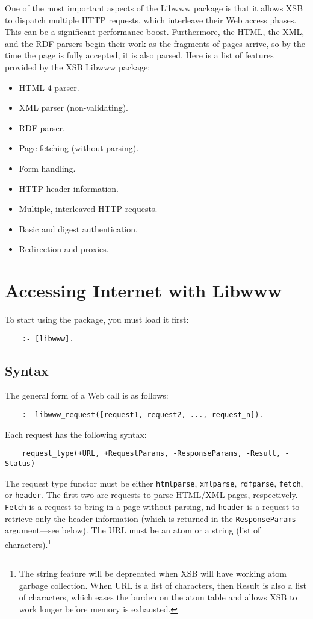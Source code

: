 One of the most important aspects of the Libwww package is that it allows
XSB to dispatch multiple HTTP requests, which interleave their Web access
phases. This can be a significant performance boost. Furthermore, the HTML,
the XML, and the RDF parsers begin their work as the fragments of pages
arrive, so by the time the page is fully accepted, it is also parsed. Here
is a list of features provided by the XSB Libwww package:
\begin{itemize}
  \item  HTML-4 parser.
  \item  XML parser (non-validating).
  \item  RDF parser.
  \item  Page fetching (without parsing).
  \item  Form handling.
  \item  HTTP header information.
  \item  Multiple, interleaved HTTP requests.
  \item  Basic and digest authentication.
  \item  Redirection and proxies.
\end{itemize}

\section{Accessing Internet with Libwww}

To start using the package, you must load it first:
\begin{verbatim}
    :- [libwww].  
\end{verbatim}

\subsection{Syntax}

The general form of a Web call is as follows:

\begin{verbatim}
    :- libwww_request([request1, request2, ..., request_n]).  
\end{verbatim}
Each request has the following syntax:
\begin{verbatim}
    request_type(+URL, +RequestParams, -ResponseParams, -Result, -Status)
\end{verbatim}
The request type functor must be either {\tt htmlparse}, {\tt xmlparse},
{\tt rdfparse}, {\tt fetch}, or {\tt header}. The first two are requests to
parse HTML/XML pages, respectively. {\tt Fetch} is a request to bring in a
page without parsing, nd {\tt header} is a request to retrieve only the
header information (which is returned in the {\tt ResponseParams}
argument---see below).
The URL must be an atom or a string (list of characters).\footnote{
  The string feature will be deprecated when XSB will have working atom
  garbage collection. When URL is a list of characters, then Result is also
  a list of characters, which eases the burden on the atom table and allows
  XSB to work longer before memory is exhausted.
  }

